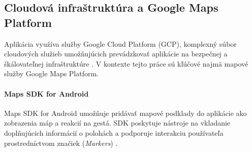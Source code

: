 \subsection{Cloudová infraštruktúra a Google Maps Platform}
Aplikácia využíva služby Google Cloud Platform (GCP), komplexný súbor 
cloudových služieb umožňujúcich prevádzkovať aplikácie na bezpečnej a 
škálovateľnej infraštruktúre \cite{gfg_gcp}. V kontexte tejto práce sú kľúčové najmä mapové služby Google Maps Platform.

\paragraph{Maps SDK for Android}
Maps SDK for Android umožňuje pridávať mapové podklady do aplikácie ako zobrazenia máp a reakcií na gestá. 
SDK poskytuje nástroje na vkladanie doplňujúcich informácií o polohách a podporuje interakciu používateľa prostredníctvom značiek (\textit{Markers}) \cite{google_maps_sdk}.

